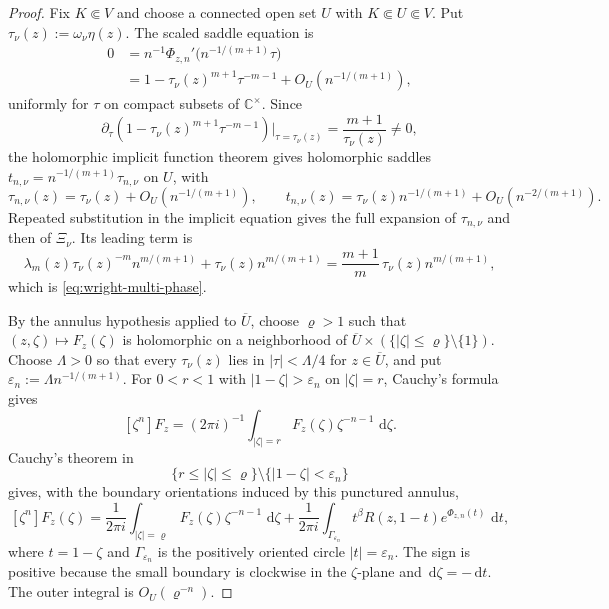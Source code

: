\documentclass[10pt,a4paper]{amsart}
\newcommand{\C}{\mathbb C}
\newcommand{\dd}{\,\mathrm d}
\begin{document}
\begin{proof}
Fix $K\Subset V$ and choose a connected open set $U$ with $K\Subset U\Subset V$. Put $\tau_\nu(z):=\omega_\nu\eta(z)$. The scaled saddle equation is
\begin{align*}
0
&=n^{-1}\Phi_{z,n}'\!\bigl(n^{-1/(m+1)}\tau\bigr)\\
&=1-\tau_\nu(z)^{m+1}\tau^{-m-1}+O_U\!\left(n^{-1/(m+1)}\right),
\end{align*}
uniformly for $\tau$ on compact subsets of $\C^\times$. Since
$$\partial_\tau\!\left(1-\tau_\nu(z)^{m+1}\tau^{-m-1}\right)\Big|_{\tau=\tau_\nu(z)}=\frac{m+1}{\tau_\nu(z)}\ne0,$$
the holomorphic implicit function theorem gives holomorphic saddles $t_{n,\nu}=n^{-1/(m+1)}\tau_{n,\nu}$ on $U$, with
$$\tau_{n,\nu}(z)=\tau_\nu(z)+O_U\!\left(n^{-1/(m+1)}\right),
\qquad
 t_{n,\nu}(z)=\tau_\nu(z)n^{-1/(m+1)}+O_U\!\left(n^{-2/(m+1)}\right).$$
Repeated substitution in the implicit equation gives the full expansion of $\tau_{n,\nu}$ and then of $\Xi_\nu$. Its leading term is
$$\lambda_m(z)\tau_\nu(z)^{-m}n^{m/(m+1)}+\tau_\nu(z)n^{m/(m+1)}
=\frac{m+1}{m}\,\tau_\nu(z)n^{m/(m+1)},$$
which is \eqref{eq:wright-multi-phase}.

By the annulus hypothesis applied to $\overline U$, choose $\varrho>1$ such that $(z,\zeta)\mapsto F_z(\zeta)$ is holomorphic on a neighborhood of $\overline U\times(\{|\zeta|\le\varrho\}\setminus\{1\})$. Choose $\Lambda>0$ so that every $\tau_\nu(z)$ lies in $|\tau|<\Lambda/4$ for $z\in\overline U$, and put $\varepsilon_n:=\Lambda n^{-1/(m+1)}$. For $0<r<1$ with $|1-\zeta|>\varepsilon_n$ on $|\zeta|=r$, Cauchy's formula gives
$$[\zeta^n]F_z=(2\pi i)^{-1}\int_{|\zeta|=r}F_z(\zeta)\zeta^{-n-1}\,\dd\zeta.$$
Cauchy's theorem in
$$\{r\le |\zeta|\le\varrho\}\setminus\{|1-\zeta|<\varepsilon_n\}$$
gives, with the boundary orientations induced by this punctured annulus,
\begin{equation}\label{eq:wright-contour-split}
[\zeta^n]F_z(\zeta)=\frac{1}{2\pi i}\int_{|\zeta|=\varrho}F_z(\zeta)\zeta^{-n-1}\,\dd\zeta
+\frac{1}{2\pi i}\int_{\Gamma_{\varepsilon_n}} t^\beta R(z,1-t)e^{\Phi_{z,n}(t)}\,\dd t,
\end{equation}
where $t=1-\zeta$ and $\Gamma_{\varepsilon_n}$ is the positively oriented circle $|t|=\varepsilon_n$. The sign is positive because the small boundary is clockwise in the $\zeta$-plane and $\dd\zeta=-\dd t$. The outer integral is $O_U(\varrho^{-n})$.


\end{proof}
\end{document}
